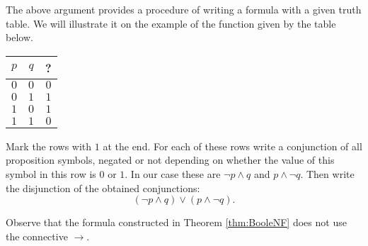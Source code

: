 The above argument provides a procedure of writing a formula with a given truth table.
We will illustrate it on the example of the function given by the table below.

\begin{center}
\begin{tabular}{|c|c|c|}
\hline
$p$ & $q$ & ?\\\hline
$0$ & $0$ & $0$\\\hline
$0$ & $1$ & $1$\\\hline
$1$ & $0$ & $1$\\\hline
$1$ & $1$ & $0$\\\hline
\end{tabular}
\end{center}

Mark the rows with $1$ at the end.
For each of these rows write a conjunction of all proposition symbols, negated or not depending on whether the value of this symbol in this row is $0$ or $1$.
In our case these are $\neg p \wedge q$ and $p \wedge \neg q$.
Then write the disjunction of the obtained conjunctions:
\[
(\neg p \wedge q) \vee (p \wedge \neg q).
\]

Observe that the formula constructed in Theorem \ref{thm:BooleNF} does not use the connective $\to$.


